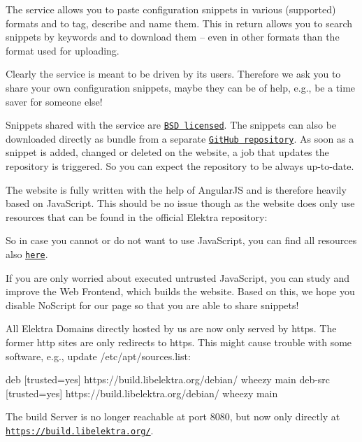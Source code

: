 The service allows you to paste configuration snippets in various (supported) formats and to tag, describe and name them. This in return allows you to search snippets by keywords and to download them -- even in other formats than the format used for uploading.

Clearly the service is meant to be driven by its users. Therefore we ask you to share your own configuration snippets, maybe they can be of help, e.\+g., be a time saver for someone else!

Snippets shared with the service are \href{https://www.libelektra.org/devgettingstarted/license}{\tt B\+SD licensed}. The snippets can also be downloaded directly as bundle from a separate \href{https://github.com/ElektraInitiative/snippets}{\tt Git\+Hub repository}. As soon as a snippet is added, changed or deleted on the website, a job that updates the repository is triggered. So you can expect the repository to be always up-\/to-\/date.

The website is fully written with the help of Angular\+JS and is therefore heavily based on Java\+Script. This should be no issue though as the website does only use resources that can be found in the official Elektra repository\+:


\begin{DoxyEnumerate}
\item So in case you cannot or do not want to use Java\+Script, you can find all resources also \href{https://git.libelektra.org}{\tt here}.
\item If you are only worried about executed untrusted Java\+Script, you can study and improve the Web Frontend, which builds the website. Based on this, we hope you disable {\ttfamily No\+Script} for our page so that you are able to share snippets!
\end{DoxyEnumerate}

All Elektra Domains directly hosted by us are now only served by {\ttfamily https}. The former {\ttfamily http} sites are only redirects to {\ttfamily https}. This might cause trouble with some software, e.\+g., update {\ttfamily /etc/apt/sources.list}\+:


\begin{DoxyCode}
deb     [trusted=yes] https://build.libelektra.org/debian/ wheezy main
deb-src [trusted=yes] https://build.libelektra.org/debian/ wheezy main
\end{DoxyCode}


The build Server is no longer reachable at port 8080, but now only directly at \href{https://build.libelektra.org/}{\tt https\+://build.\+libelektra.\+org/}.

